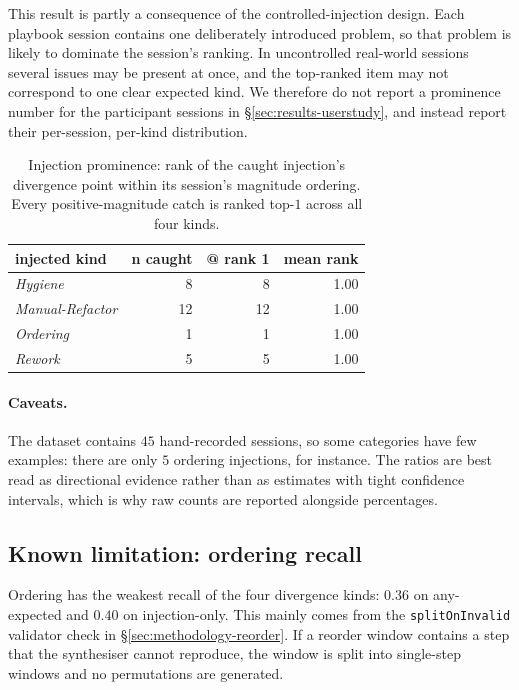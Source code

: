 This result is partly a consequence of the controlled-injection design. Each playbook session contains one deliberately introduced problem, so that problem is likely to dominate the session's ranking. In uncontrolled real-world sessions several issues may be present at once, and the top-ranked item may not correspond to one clear expected kind. We therefore do not report a prominence number for the participant sessions in \S\ref{sec:results-userstudy}, and instead report their per-session, per-kind distribution.

\begin{table}[htbp]
\centering
\small
\begin{tabular}{lrrr}
\hline
\textbf{injected kind} & \textbf{n caught} & \textbf{@ rank 1} & \textbf{mean rank} \\
\hline
\emph{Hygiene}     &  8 &  8 & 1.00 \\
\emph{Manual-Refactor} & 12 & 12 & 1.00 \\
\emph{Ordering}    &  1 &  1 & 1.00 \\
\emph{Rework}      &  5 &  5 & 1.00 \\
\hline
\end{tabular}
\caption{Injection prominence: rank of the caught injection's divergence point within its session's magnitude ordering. Every positive-magnitude catch is ranked top-$1$ across all four kinds.}
\label{tab:results-divergence-prominence}
\end{table}

\paragraph{Caveats.}
The dataset contains $45$ hand-recorded sessions, so some categories have few examples: there are only $5$ ordering injections, for instance. The ratios are best read as directional evidence rather than as estimates with tight confidence intervals, which is why raw counts are reported alongside percentages.

\subsection{Known limitation: ordering recall}
\label{sec:results-scoped-out}

Ordering has the weakest recall of the four divergence kinds: $0.36$ on any-expected and $0.40$ on injection-only. This mainly comes from the \texttt{splitOnInvalid} validator check in \S\ref{sec:methodology-reorder}. If a reorder window contains a step that the synthesiser cannot reproduce, the window is split into single-step windows and no permutations are generated.

